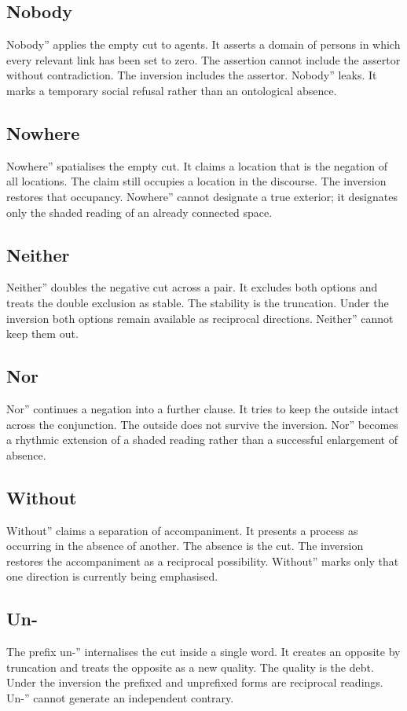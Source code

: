 \documentclass[11pt,a4paper]{article}
\begin{document}
\subsection{Nobody} Nobody'' applies the empty cut to agents. It asserts a domain of persons in which every relevant link has been set to zero. The assertion cannot include the assertor without contradiction. The inversion includes the assertor. Nobody'' leaks. It marks a temporary social refusal rather than an ontological absence.

\subsection{Nowhere} Nowhere'' spatialises the empty cut. It claims a location that is the negation of all locations. The claim still occupies a location in the discourse. The inversion restores that occupancy. Nowhere'' cannot designate a true exterior; it designates only the shaded reading of an already connected space.

\subsection{Neither} Neither'' doubles the negative cut across a pair. It excludes both options and treats the double exclusion as stable. The stability is the truncation. Under the inversion both options remain available as reciprocal directions. Neither'' cannot keep them out.

\subsection{Nor} Nor'' continues a negation into a further clause. It tries to keep the outside intact across the conjunction. The outside does not survive the inversion. Nor'' becomes a rhythmic extension of a shaded reading rather than a successful enlargement of absence.

\subsection{Without} Without'' claims a separation of accompaniment. It presents a process as occurring in the absence of another. The absence is the cut. The inversion restores the accompaniment as a reciprocal possibility. Without'' marks only that one direction is currently being emphasised.

\subsection{Un-} The prefix un-'' internalises the cut inside a single word. It creates an opposite by truncation and treats the opposite as a new quality. The quality is the debt. Under the inversion the prefixed and unprefixed forms are reciprocal readings. Un-'' cannot generate an independent contrary.
\end{document}
